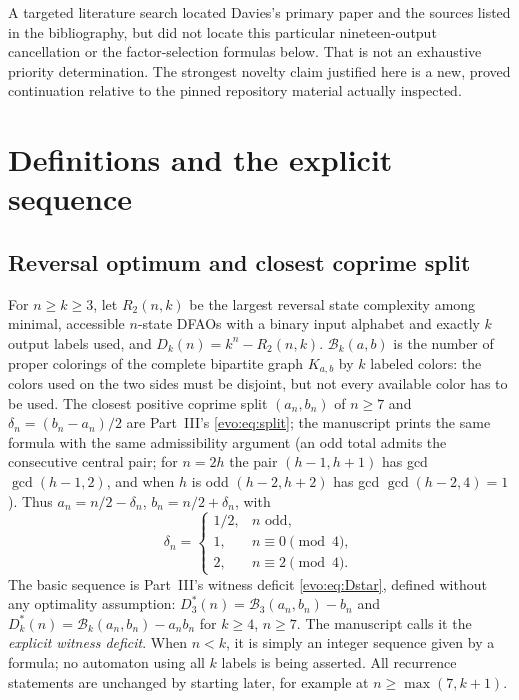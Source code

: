 \documentclass[11pt,a4paper]{article}
\numberwithin{equation}{section}
\theoremstyle{definition}
\theoremstyle{remark}
\newcommand{\Bip}{\mathcal B}
\begin{document}
A targeted literature search located Davies's primary paper and the
sources listed in the bibliography, but did not locate this particular
nineteen-output cancellation or the factor-selection formulas below.
That is not an exhaustive priority determination. The strongest novelty
claim justified here is a new, proved continuation relative to the pinned
repository material actually inspected.

\section{Definitions and the explicit sequence}\label{sc:sec:definitions}

\subsection{Reversal optimum and closest coprime split}
For $n\ge k\ge3$, let $R_2(n,k)$ be the largest reversal state complexity
among minimal, accessible $n$-state DFAOs with a binary input alphabet and
exactly $k$ output labels used, and $D_k(n)=k^n-R_2(n,k)$. $\Bip_k(a,b)$
is the number of proper colorings of the complete bipartite graph $K_{a,b}$
by $k$ labeled colors: the colors used on the two sides must be disjoint,
but not every available color has to be used. The closest positive coprime
split $(a_n,b_n)$ of $n\ge7$ and $\delta_n=(b_n-a_n)/2$ are Part~III's
\eqref{evo:eq:split}; the manuscript prints the same formula with the same
admissibility argument (an odd total admits the consecutive central pair;
for $n=2h$ the pair $(h-1,h+1)$ has gcd $\gcd(h-1,2)$, and when $h$ is odd
$(h-2,h+2)$ has gcd $\gcd(h-2,4)=1$). Thus $a_n=n/2-\delta_n$,
$b_n=n/2+\delta_n$, with
\begin{equation}\label{sc:eq:delta}
 \delta_n=\begin{cases}
 1/2,&n\text{ odd},\\1,&n\equiv0\pmod4,\\2,&n\equiv2\pmod4.
 \end{cases}
\end{equation}
The basic sequence is Part~III's witness deficit \eqref{evo:eq:Dstar},
defined without any optimality assumption: $D^*_3(n)=\Bip_3(a_n,b_n)-b_n$
and $D^*_k(n)=\Bip_k(a_n,b_n)-a_nb_n$ for $k\ge4$, $n\ge7$. The manuscript
calls it the \emph{explicit witness deficit}. When $n<k$, it is simply
an integer sequence given by a formula; no automaton using all $k$ labels
is being asserted. All recurrence statements are unchanged by starting
later, for example at $n\ge\max(7,k+1)$.
\end{document}
